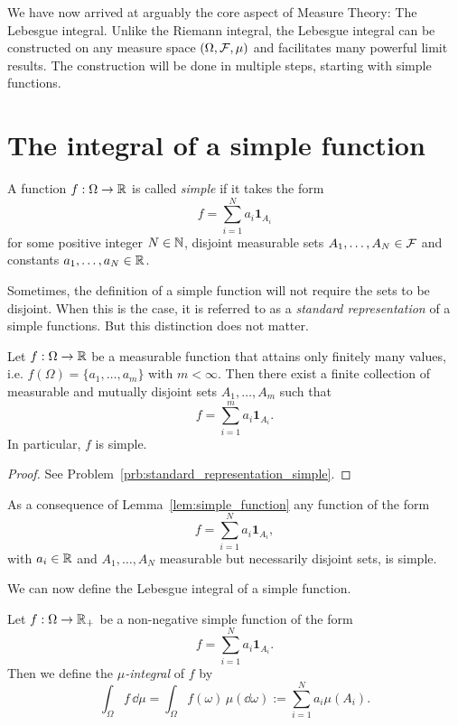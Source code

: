 We have now arrived at arguably the core aspect of Measure Theory: The Lebesgue integral. Unlike the Riemann integral, the Lebesgue integral can be constructed on any measure space $(\Omega,\mathcal F,\mu)$ and facilitates many powerful limit results. The construction will be done in multiple steps, starting with simple functions.

\section{The integral of a simple function}\label{sec:integral_simple_functions}

\begin{definition}\label{def:simple_function}
A function $f: \Omega \to \mathbb R$ is called \emph{simple} if it takes the form
\[
f = \sum_{i=1}^N a_i \mathbf{1}_{A_i}
\]
for some positive integer $N \in \mathbb N$, disjoint measurable sets $A_1, \ldots, A_N \in \mathcal F$ and constants $a_1, \dots, a_N  \in \mathbb R$.
\end{definition}

Sometimes, the definition of a simple function will not require the sets to be disjoint. When this is the case, it is referred to as a \emph{standard representation} of a simple functions. But this distinction does not matter.

\begin{lemma}\label{lem:simple_function}
Let $f: \Omega \to \mathbb R$ be a measurable function that attains only finitely many values, i.e. $f(\Omega) = \{a_1, \dots, a_m\}$ with $m < \infty$. Then there exist a finite collection of measurable and mutually disjoint sets $A_1, \dots, A_m$ such that 
\[
	f = \sum_{i = 1}^m a_i \mathbf{1}_{A_i}.
\]
In particular, $f$ is simple.
\end{lemma}

\begin{proof}
See Problem~\ref{prb:standard_representation_simple}.
\end{proof}

As a consequence of Lemma~\ref{lem:simple_function} any function of the form
\[
	f = \sum_{i=1}^N a_i \mathbf{1}_{A_i},
\]
with $a_i \in \mathbb R$ and $A_1, \dots, A_N$ measurable but necessarily disjoint sets, is simple. 

We can now define the Lebesgue integral of a simple function.

\begin{definition}\label{def:Lebesgue_integral_simple}
Let $f: \Omega \to \mathbb R_+$ be a non-negative simple function of the form
\[
	f = \sum_{i=1}^N a_i \mathbf{1}_{A_i}.
\] 
Then we define the \emph{$\mu$-integral} of $f$ by
\[
	\int_\Omega f\, \dd \mu = \int_\Omega f(\omega)\,\mu(\dd\omega) := \sum_{i = 1}^N a_i \mu(A_i).
\]
\end{definition}

